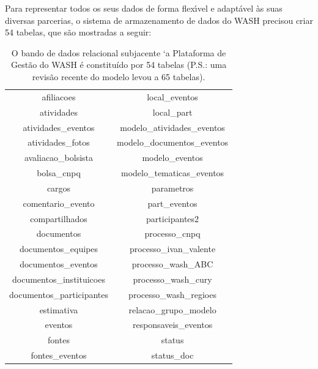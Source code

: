 \documentclass[
12pt,		%
openright,	%
twoside,  %
a4paper,			%
chapter=TITLE,		%
english,			%
french,				%
spanish,			%
brazil				%
]{USPSC-classe/USPSC}
\begin{document}
Para representar todos os seus dados de forma flex\'{\i}vel e adapt\'avel \`as suas diversas parcerias, o sistema de armazenamento de dados do WASH precisou criar 54 tabelas, que s\~ao mostradas a seguir:













\begin{table}[htb]
\tiny
\caption{\label{5b2e4ba8f3836249e7dd88b37344da7bfa3669c5}O bando de dados relacional subjacente `a Plataforma de Gest\~ao do WASH \'e constitu\'{i}do por 54 tabelas (P.S.: uma revis\~ao recente do modelo levou a 65 tabelas).}

\centering
\begin{tabular}{|c|c|}
\hline
afiliacoes                     &   local\_eventos \\
 atividades                     &   local\_part \\
 atividades\_eventos             &   modelo\_atividades\_eventos \\
 atividades\_fotos               &   modelo\_documentos\_eventos \\
 avaliacao\_bolsista             &   modelo\_eventos \\
 bolsa\_cnpq                     &   modelo\_tematicas\_eventos \\
 cargos                         &   parametros \\
 comentario\_evento              &   part\_eventos \\
 compartilhados                 &   participantes2 \\
 documentos                     &   processo\_cnpq \\
 documentos\_equipes             &   processo\_ivan\_valente \\
 documentos\_eventos             &   processo\_wash\_ABC \\
 documentos\_instituicoes        &   processo\_wash\_cury \\
 documentos\_participantes       &   processo\_wash\_regioes \\
 estimativa                     &   relacao\_grupo\_modelo \\
 eventos                        &   responsaveis\_eventos \\
 fontes                         &   status \\
 fontes\_eventos                 &   status\_doc \\

\end{tabular}
\end{table}
\end{document}
